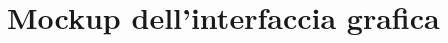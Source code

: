 \documentclass[../SpecificaTecnica.tex]{subfiles}
\begin{document}
\section{Mockup dell'interfaccia grafica}
	
\end{document}
